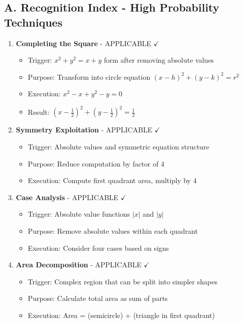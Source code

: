 \documentclass[]{article}
\begin{document}
\begin{techniquesbox}
\subsection*{A. Recognition Index - High Probability Techniques}
\begin{enumerate}[leftmargin=*]
    \item \textbf{Completing the Square} - APPLICABLE $\checkmark$
    \begin{itemize}
        \item Trigger: $x^2 + y^2 = x + y$ form after removing absolute values
        \item Purpose: Transform into circle equation $(x-h)^2 + (y-k)^2 = r^2$
        \item Execution: $x^2 - x + y^2 - y = 0$
        \item Result: $(x-\frac{1}{2})^2 + (y-\frac{1}{2})^2 = \frac{1}{2}$
    \end{itemize}
    
    \item \textbf{Symmetry Exploitation} - APPLICABLE $\checkmark$
    \begin{itemize}
        \item Trigger: Absolute values and symmetric equation structure
        \item Purpose: Reduce computation by factor of 4
        \item Execution: Compute first quadrant area, multiply by 4
    \end{itemize}
    
    \item \textbf{Case Analysis} - APPLICABLE $\checkmark$
    \begin{itemize}
        \item Trigger: Absolute value functions $|x|$ and $|y|$
        \item Purpose: Remove absolute values within each quadrant
        \item Execution: Consider four cases based on signs
    \end{itemize}
    
    \item \textbf{Area Decomposition} - APPLICABLE $\checkmark$
    \begin{itemize}
        \item Trigger: Complex region that can be split into simpler shapes
        \item Purpose: Calculate total area as sum of parts
        \item Execution: Area = (semicircle) + (triangle in first quadrant)
    \end{itemize}
\end{enumerate}


\end{techniquesbox}
\end{document}
